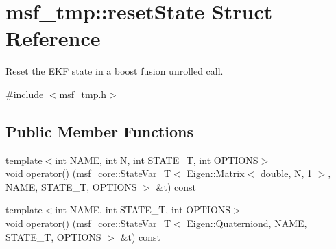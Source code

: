 \hypertarget{structmsf__tmp_1_1resetState}{\section{msf\-\_\-tmp\-:\-:reset\-State Struct Reference}
\label{structmsf__tmp_1_1resetState}
}


Reset the E\-K\-F state in a boost fusion unrolled call.  




{\ttfamily \#include $<$msf\-\_\-tmp.\-h$>$}

\subsection*{Public Member Functions}
\begin{DoxyCompactItemize}
\item 
{\footnotesize template$<$int N\-A\-M\-E, int N, int S\-T\-A\-T\-E\-\_\-\-T, int O\-P\-T\-I\-O\-N\-S$>$ }\\void \hyperlink{structmsf__tmp_1_1resetState_aa7e3525c8c9777ba163da0f64872eaca}{operator()} (\hyperlink{structmsf__core_1_1StateVar__T}{msf\-\_\-core\-::\-State\-Var\-\_\-\-T}$<$ Eigen\-::\-Matrix$<$ double, N, 1 $>$, N\-A\-M\-E, S\-T\-A\-T\-E\-\_\-\-T, O\-P\-T\-I\-O\-N\-S $>$ \&t) const 
\item 
{\footnotesize template$<$int N\-A\-M\-E, int S\-T\-A\-T\-E\-\_\-\-T, int O\-P\-T\-I\-O\-N\-S$>$ }\\void \hyperlink{structmsf__tmp_1_1resetState_af31c01964acef3d4a598ee139b9e7013}{operator()} (\hyperlink{structmsf__core_1_1StateVar__T}{msf\-\_\-core\-::\-State\-Var\-\_\-\-T}$<$ Eigen\-::\-Quaterniond, N\-A\-M\-E, S\-T\-A\-T\-E\-\_\-\-T, O\-P\-T\-I\-O\-N\-S $>$ \&t) const 
\end{DoxyCompactItemize}



